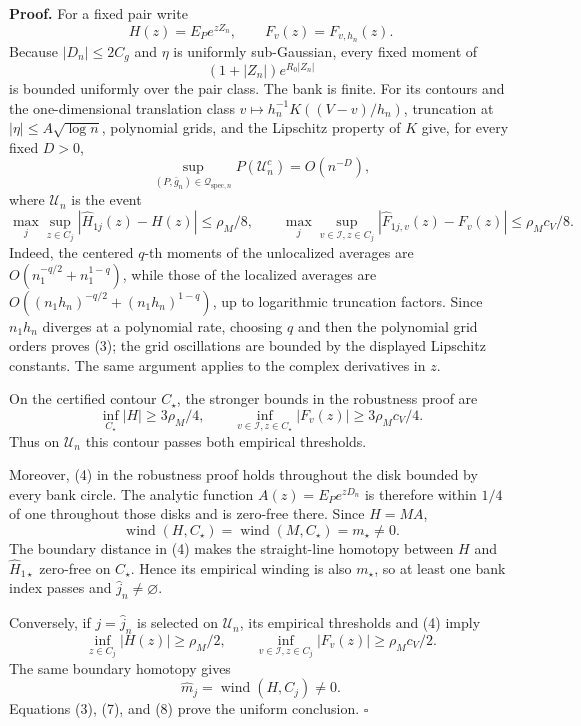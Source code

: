 \textbf{Proof.}
For a fixed pair write
\[
 H(z)=E_Pe^{zZ_n},\qquad F_v(z)=F_{v,h_n}(z). \tag{1}
\]
Because \(|D_n|\le2C_g\) and \(\eta\) is uniformly sub-Gaussian, every fixed moment of
\[
 (1+|Z_n|)e^{R_0|Z_n|} \tag{2}
\]
is bounded uniformly over the pair class. The bank is finite. For its contours and the one-dimensional translation class \(v\mapsto h_n^{-1}K((V-v)/h_n)\), truncation at \(|\eta|\le A\sqrt{\log n}\), polynomial grids, and the Lipschitz property of \(K\) give, for every fixed \(D>0\),
\[
 \sup_{(P,\bar g_n)\in\mathcal Q_{\mathrm{spec},n}}
 P(\mathcal U_n^c)=O(n^{-D}), \tag{3}
\]
where \(\mathcal U_n\) is the event
\[
 \max_j\sup_{z\in C_j}|\widehat H_{1j}(z)-H(z)|\le\rho_M/8,
 \qquad
 \max_j\sup_{v\in\mathcal I,z\in C_j}
 |\widehat F_{1j,v}(z)-F_v(z)|\le\rho_Mc_V/8. \tag{4}
\]
Indeed, the centered \(q\)-th moments of the unlocalized averages are \(O(n_1^{-q/2}+n_1^{1-q})\), while those of the localized averages are \(O((n_1h_n)^{-q/2}+(n_1h_n)^{1-q})\), up to logarithmic truncation factors. Since \(n_1h_n\) diverges at a polynomial rate, choosing \(q\) and then the polynomial grid orders proves (3); the grid oscillations are bounded by the displayed Lipschitz constants. The same argument applies to the complex derivatives in \(z\).

On the certified contour \(C_\star\), the stronger bounds in the robustness proof are
\[
 \inf_{C_\star}|H|\ge3\rho_M/4,\qquad
 \inf_{v\in\mathcal I,z\in C_\star}|F_v(z)|
 \ge3\rho_Mc_V/4. \tag{5}
\]
Thus on \(\mathcal U_n\) this contour passes both empirical thresholds.

Moreover, (4) in the robustness proof holds throughout the disk bounded by every bank circle. The analytic function \(A(z)=E_Pe^{zD_n}\) is therefore within \(1/4\) of one throughout those disks and is zero-free there. Since \(H=MA\),
\[
 \operatorname{wind}(H,C_\star)
 =\operatorname{wind}(M,C_\star)=m_\star\ne0. \tag{6}
\]
The boundary distance in (4) makes the straight-line homotopy between \(H\) and \(\widehat H_{1\star}\) zero-free on \(C_\star\). Hence its empirical winding is also \(m_\star\), so at least one bank index passes and \(\widehat j_n\ne\varnothing\).

Conversely, if \(j=\widehat j_n\) is selected on \(\mathcal U_n\), its empirical thresholds and (4) imply
\[
 \inf_{z\in C_j}|H(z)|\ge\rho_M/2,\qquad
 \inf_{v\in\mathcal I,z\in C_j}|F_v(z)|
 \ge\rho_Mc_V/2. \tag{7}
\]
The same boundary homotopy gives
\[
 \widehat m_j=\operatorname{wind}(H,C_j)\ne0. \tag{8}
\]
Equations (3), (7), and (8) prove the uniform conclusion. \(\square\)
